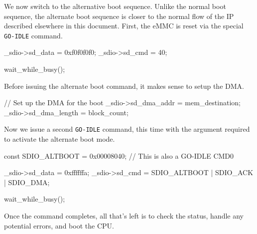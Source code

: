 \documentclass{gqtekspec}
\begin{document}
We now switch to the alternative boot sequence.  Unlike the normal boot
sequence, the alternate boot sequence is closer to the normal flow of the IP
described elsewhere in this document.  First, the eMMC is reset via the special
{\tt GO-IDLE} command.
\begin{zCpp}
	_sdio->sd_data = 0xf0f0f0f0;
	_sdio->sd_cmd  = 40;

	wait_while_busy();
\end{zCpp}
Before issuing the alternate boot command, it makes sense to setup the DMA.
\begin{zCpp}
	// Set up the DMA for the boot
	_sdio->sd_dma_addr   = mem_destination;
	_sdio->sd_dma_length = block_count;
\end{zCpp}
Now we issue a second {\tt GO-IDLE} command, this time with the argument
required to activate the alternate boot mode.
\begin{zCpp}
	const	SDIO_ALTBOOT    = 0x00008040;	// This is also a GO-IDLE CMD0

	_sdio->sd_data = 0xffffffa;
	_sdio->sd_cmd  = SDIO_ALTBOOT | SDIO_ACK | SDIO_DMA;

	wait_while_busy();
\end{zCpp}
Once the command completes, all that's left is to check the status, handle
any potential errors, and boot the CPU.

\end{document}

